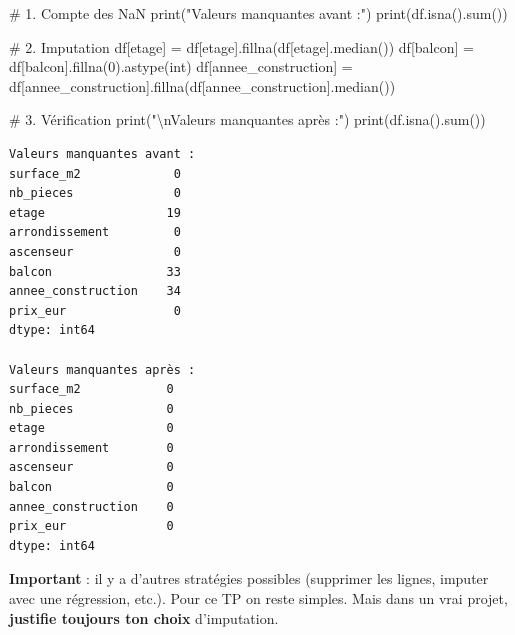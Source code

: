 \documentclass[
  french,
  11pt,
  a4paper,
]{scrbook}
\newenvironment{Shaded}{}{}
\newcommand{\BuiltInTok}[1]{\textcolor[rgb]{0.84,0.23,0.29}{#1}}
\newcommand{\CharTok}[1]{\textcolor[rgb]{0.01,0.18,0.38}{#1}}
\newcommand{\CommentTok}[1]{\textcolor[rgb]{0.42,0.45,0.49}{#1}}
\newcommand{\DecValTok}[1]{\textcolor[rgb]{0.00,0.36,0.77}{#1}}
\newcommand{\NormalTok}[1]{\textcolor[rgb]{0.14,0.16,0.18}{#1}}
\newcommand{\OperatorTok}[1]{\textcolor[rgb]{0.14,0.16,0.18}{#1}}
\newcommand{\StringTok}[1]{\textcolor[rgb]{0.01,0.18,0.38}{#1}}
\begin{document}
\begin{tcolorbox}[enhanced jigsaw, arc=.35mm, bottomrule=.15mm, bottomtitle=1mm, breakable, colback=white, colbacktitle=quarto-callout-tip-color!10!white, colframe=quarto-callout-tip-color-frame, coltitle=black, left=2mm, leftrule=.75mm, opacityback=0, opacitybacktitle=0.6, rightrule=.15mm, title=\textcolor{quarto-callout-tip-color}{\faLightbulb}\hspace{0.5em}{✅ Corrigé Étape 2.3}, titlerule=0mm, toprule=.15mm, toptitle=1mm]

\begin{Shaded}
\begin{Highlighting}[]
\CommentTok{\# 1. Compte des NaN}
\BuiltInTok{print}\NormalTok{(}\StringTok{"Valeurs manquantes avant :"}\NormalTok{)}
\BuiltInTok{print}\NormalTok{(df.isna().}\BuiltInTok{sum}\NormalTok{())}

\CommentTok{\# 2. Imputation}
\NormalTok{df[}\StringTok{\textquotesingle{}etage\textquotesingle{}}\NormalTok{] }\OperatorTok{=}\NormalTok{ df[}\StringTok{\textquotesingle{}etage\textquotesingle{}}\NormalTok{].fillna(df[}\StringTok{\textquotesingle{}etage\textquotesingle{}}\NormalTok{].median())}
\NormalTok{df[}\StringTok{\textquotesingle{}balcon\textquotesingle{}}\NormalTok{] }\OperatorTok{=}\NormalTok{ df[}\StringTok{\textquotesingle{}balcon\textquotesingle{}}\NormalTok{].fillna(}\DecValTok{0}\NormalTok{).astype(}\BuiltInTok{int}\NormalTok{)}
\NormalTok{df[}\StringTok{\textquotesingle{}annee\_construction\textquotesingle{}}\NormalTok{] }\OperatorTok{=}\NormalTok{ df[}\StringTok{\textquotesingle{}annee\_construction\textquotesingle{}}\NormalTok{].fillna(df[}\StringTok{\textquotesingle{}annee\_construction\textquotesingle{}}\NormalTok{].median())}

\CommentTok{\# 3. Vérification}
\BuiltInTok{print}\NormalTok{(}\StringTok{"}\CharTok{\textbackslash{}n}\StringTok{Valeurs manquantes après :"}\NormalTok{)}
\BuiltInTok{print}\NormalTok{(df.isna().}\BuiltInTok{sum}\NormalTok{())}
\end{Highlighting}
\end{Shaded}

\begin{verbatim}
Valeurs manquantes avant :
surface_m2             0
nb_pieces              0
etage                 19
arrondissement         0
ascenseur              0
balcon                33
annee_construction    34
prix_eur               0
dtype: int64

Valeurs manquantes après :
surface_m2            0
nb_pieces             0
etage                 0
arrondissement        0
ascenseur             0
balcon                0
annee_construction    0
prix_eur              0
dtype: int64
\end{verbatim}

\textbf{Important} : il y a d'autres stratégies possibles (supprimer les
lignes, imputer avec une régression, etc.). Pour ce TP on reste simples.
Mais dans un vrai projet, \textbf{justifie toujours ton choix}
d'imputation.

\end{tcolorbox}
\end{document}
